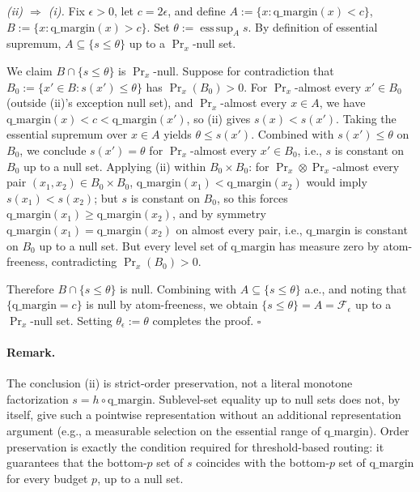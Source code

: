 \documentclass{article}
\begin{document}
\emph{(ii) $\Rightarrow$ (i).} Fix $\epsilon > 0$, let $c = 2\epsilon$, and define $A := \{x : \mathrm{q\_margin}(x) < c\}$, $B := \{x : \mathrm{q\_margin}(x) > c\}$. Set $\theta := \operatorname*{ess\,sup}_A s$. By definition of essential supremum, $A \subseteq \{s \leq \theta\}$ up to a $\Pr_x$-null set.

We claim $B \cap \{s \leq \theta\}$ is $\Pr_x$-null. Suppose for contradiction that $B_0 := \{x' \in B : s(x') \leq \theta\}$ has $\Pr_x(B_0) > 0$. For $\Pr_x$-almost every $x' \in B_0$ (outside (ii)'s exception null set), and $\Pr_x$-almost every $x \in A$, we have $\mathrm{q\_margin}(x) < c < \mathrm{q\_margin}(x')$, so (ii) gives $s(x) < s(x')$. Taking the essential supremum over $x \in A$ yields $\theta \leq s(x')$. Combined with $s(x') \leq \theta$ on $B_0$, we conclude $s(x') = \theta$ for $\Pr_x$-almost every $x' \in B_0$, i.e., $s$ is constant on $B_0$ up to a null set. Applying (ii) within $B_0 \times B_0$: for $\Pr_x \otimes \Pr_x$-almost every pair $(x_1, x_2) \in B_0 \times B_0$, $\mathrm{q\_margin}(x_1) < \mathrm{q\_margin}(x_2)$ would imply $s(x_1) < s(x_2)$; but $s$ is constant on $B_0$, so this forces $\mathrm{q\_margin}(x_1) \geq \mathrm{q\_margin}(x_2)$, and by symmetry $\mathrm{q\_margin}(x_1) = \mathrm{q\_margin}(x_2)$ on almost every pair, i.e., $\mathrm{q\_margin}$ is constant on $B_0$ up to a null set. But every level set of $\mathrm{q\_margin}$ has measure zero by atom-freeness, contradicting $\Pr_x(B_0) > 0$.

Therefore $B \cap \{s \leq \theta\}$ is null. Combining with $A \subseteq \{s \leq \theta\}$ a.e., and noting that $\{\mathrm{q\_margin} = c\}$ is null by atom-freeness, we obtain $\{s \leq \theta\} = A = \mathcal F_\epsilon$ up to a $\Pr_x$-null set. Setting $\theta_\epsilon := \theta$ completes the proof. \hfill$\square$

\paragraph{Remark.}
The conclusion (ii) is strict-order preservation, not a literal monotone factorization $s = h \circ \mathrm{q\_margin}$. Sublevel-set equality up to null sets does not, by itself, give such a pointwise representation without an additional representation argument (e.g., a measurable selection on the essential range of $\mathrm{q\_margin}$). Order preservation is exactly the condition required for threshold-based routing: it guarantees that the bottom-$p$ set of $s$ coincides with the bottom-$p$ set of $\mathrm{q\_margin}$ for every budget $p$, up to a null set.
\end{document}
